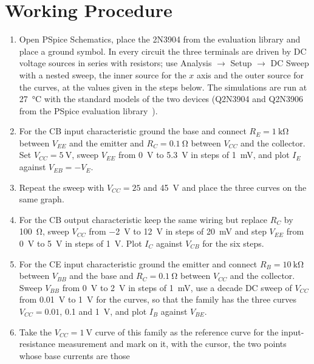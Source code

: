 \documentclass[12pt,a4paper]{article}
\begin{document}
	\section{Working Procedure}
	\begin{enumerate}[label=\arabic*., leftmargin=2.4em]
		\item Open PSpice Schematics, place the 2N3904 from the evaluation
		library and place a ground symbol. In every circuit the three
		terminals are driven by DC voltage sources in series with
		resistors; use Analysis $\rightarrow$ Setup $\rightarrow$ DC
		Sweep with a nested sweep, the inner source for the $x$ axis and
		the outer source for the curves, at the values given in the steps
		below. The simulations are run at \SI{27}{\celsius} with the standard
		models of the two devices (Q2N3904 and Q2N3906 from the
		PSpice evaluation library~\cite{ref:evallib}).
		\item For the CB input characteristic ground the base and connect
		$R_E = \SI{1}{\kilo\ohm}$ between $V_{EE}$ and the emitter and
		$R_C = \SI{0.1}{\ohm}$ between $V_{CC}$ and the collector. Set
		$V_{CC} = \SI{5}{\volt}$, sweep $V_{EE}$ from \SI{0}{\volt} to
		\SI{5.3}{\volt} in steps of \SI{1}{\milli\volt}, and plot $I_E$
		against $V_{EB} = -V_E$.
		\item Repeat the sweep with $V_{CC} = 25$ and \SI{45}{\volt} and
		place the three curves on the same graph.
		\item For the CB output characteristic keep the same wiring but replace $R_C$ by \SI{100}{\ohm}, sweep
		$V_{CC}$ from \SI{-2}{\volt} to \SI{12}{\volt} in steps of
		\SI{20}{\milli\volt} and step $V_{EE}$ from \SI{0}{\volt} to
		\SI{5}{\volt} in steps of \SI{1}{\volt}. Plot $I_C$ against
		$V_{CB}$ for the six steps.
		\item For the CE input characteristic ground the emitter and connect
		$R_B = \SI{10}{\kilo\ohm}$ between $V_{BB}$ and the base and
		$R_C = \SI{0.1}{\ohm}$ between $V_{CC}$ and the collector. Sweep
		$V_{BB}$ from \SI{0}{\volt} to \SI{2}{\volt} in steps of
		\SI{1}{\milli\volt}, use a decade DC sweep of $V_{CC}$ from
		\SI{0.01}{\volt} to \SI{1}{\volt} for the curves, so that the
		family has the three curves $V_{CC} = 0.01$, 0.1 and
		\SI{1}{\volt}, and plot $I_B$ against $V_{BE}$.
		\item Take the $V_{CC} = \SI{1}{\volt}$ curve of this family as the
		reference curve for the input-resistance measurement and mark on
		it, with the cursor, the two points whose base currents are those

\end{enumerate}
\end{document}
